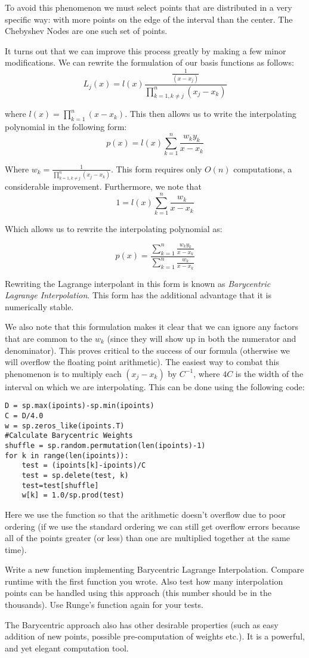 To avoid this phenomenon we must select points that are distributed in a very specific way: with more points on the edge of the interval than the center. The Chebyshev Nodes are one such set of points.

It turns out that we can improve this process greatly by making a few minor modifications. We can rewrite the formulation of our basis functions as follows:
\[
L_j(x) = l(x)\frac{\frac{1}{(x-x_j)}}{\displaystyle\prod_{k=1, k \neq j}^n (x_j-x_k)}
\]

where $l(x) = \prod_{k=1}^n (x-x_k)$. This then allows us to write the interpolating polynomial in the following form:
\[
p(x) = l(x) \sum_{k=1}^n \frac{w_k y_k}{x-x_k}
\]

Where $w_k = \frac{1}{\prod_{k=1, k \neq j}^n (x_j-x_k)}$. This form requires only $O(n)$ computations, a considerable improvement. Furthermore, we note that
\[
1 = l(x) \sum_{k=1}^n \frac{w_k}{x-x_k}
\]

Which allows us to rewrite the interpolating polynomial as:

\[
p(x) = \frac{\displaystyle\sum_{k=1}^n \frac{w_k y_k}{x-x_k}}{\displaystyle\sum_{k=1}^n \frac{w_k}{x-x_k}}
\]

Rewriting the Lagrange interpolant in this form is known as \emph{Barycentric Lagrange Interpolation}. This form has the additional advantage that it is numerically stable.

We also note that this formulation makes it clear that we can ignore any factors that are common to the $w_k$ (since they will show up in both the numerator and denominator). This proves critical to the success of our formula (otherwise we will overflow the floating point arithmetic). The easiest way to combat this phenomenon is to multiply each $(x_j-x_k)$ by $C^{-1}$, where $4C$ is the width of the interval on which we are interpolating. This can be done using the following code:

\begin{lstlisting}
D = sp.max(ipoints)-sp.min(ipoints)
C = D/4.0
w = sp.zeros_like(ipoints.T)
#Calculate Barycentric Weights
shuffle = sp.random.permutation(len(ipoints)-1)
for k in range(len(ipoints)):
    test = (ipoints[k]-ipoints)/C
    test = sp.delete(test, k)
    test=test[shuffle]
    w[k] = 1.0/sp.prod(test)
\end{lstlisting}

Here we use the  function so that the arithmetic doesn't overflow due to poor ordering (if we use the standard ordering we can still get overflow errors because all of the points greater (or less) than one are multiplied together at the same time).

\begin{problem}
Write a new function implementing Barycentric Lagrange Interpolation. Compare runtime with the first function you wrote. Also test how many interpolation points can be handled using this approach (this number should be in the thousands). Use Runge's function again for your tests.
\end{problem}

The Barycentric approach also has other desirable properties (such as easy addition of new points, possible pre-computation of weights etc.). It is a powerful, and yet elegant computation tool.